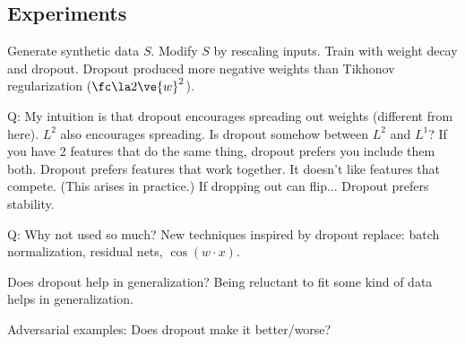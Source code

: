 \subsection{Experiments}

Generate synthetic data $S$. Modify $S$ by rescaling inputs. Train with weight decay and dropout.
Dropout produced more negative weights than Tikhonov regularization ($\fc\la2\ve{w}^2$).

Q: My intuition is that dropout encourages spreading out weights (different from here). $L^2$ also encourages spreading. Is dropout somehow between $L^2$ and $L^1$? If you have 2 features that do the same thing, dropout prefers you include them both. Dropout prefers features that work together. It doesn't like features that compete. (This arises in practice.) If dropping out can flip... Dropout prefers stability.

Q: Why not used so much? New techniques inspired by dropout replace: batch normalization, residual nets, $\cos(w\cdot x)$. 

Does dropout help in generalization? Being reluctant to fit some kind of data helps in generalization.

Adversarial examples: Does dropout make it better/worse?


